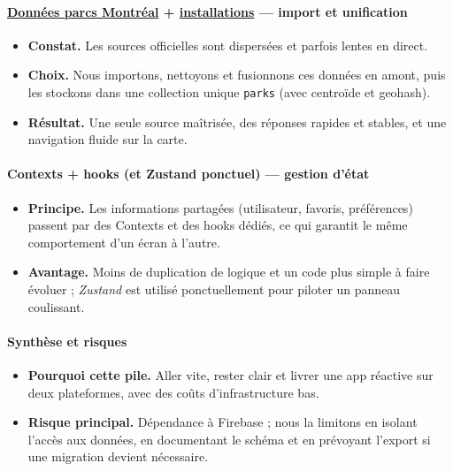 \documentclass[12pt,a4paper]{article}
\begin{document}
\paragraph{\textbf{\href{https://donnees.montreal.ca/dataset/grands-parcs-parcs-d-arrondissements-et-espaces-publics}{Données parcs Montréal}} + \textbf{\href{https://donnees.montreal.ca/dataset/installations-recreatives-sportives-et-culturelles}{installations}} — import et unification}
\begin{itemize}
  \item \textbf{Constat.} Les sources officielles sont dispersées et parfois lentes en direct.
  \item \textbf{Choix.} Nous importons, nettoyons et fusionnons ces données en amont, puis les stockons dans une collection unique \texttt{parks} (avec centroïde et geohash).
  \item \textbf{Résultat.} Une seule source maîtrisée, des réponses rapides et stables, et une navigation fluide sur la carte.
\end{itemize}

\paragraph{\textbf{Contexts + hooks} (et \textbf{Zustand} ponctuel) — gestion d’état}
\begin{itemize}
  \item \textbf{Principe.} Les informations partagées (utilisateur, favoris, préférences) passent par des Contexts et des hooks dédiés, ce qui garantit le même comportement d’un écran à l’autre.
  \item \textbf{Avantage.} Moins de duplication de logique et un code plus simple à faire évoluer ; \emph{Zustand} est utilisé ponctuellement pour piloter un panneau coulissant.
\end{itemize}

\paragraph{\textbf{Synthèse et risques}}
\begin{itemize}
  \item \textbf{Pourquoi cette pile.} Aller vite, rester clair et livrer une app réactive sur deux plateformes, avec des coûts d’infrastructure bas.
  \item \textbf{Risque principal.} Dépendance à Firebase ; nous la limitons en isolant l’accès aux données, en documentant le schéma et en prévoyant l’export si une migration devient nécessaire.
\end{itemize}
\end{document}
